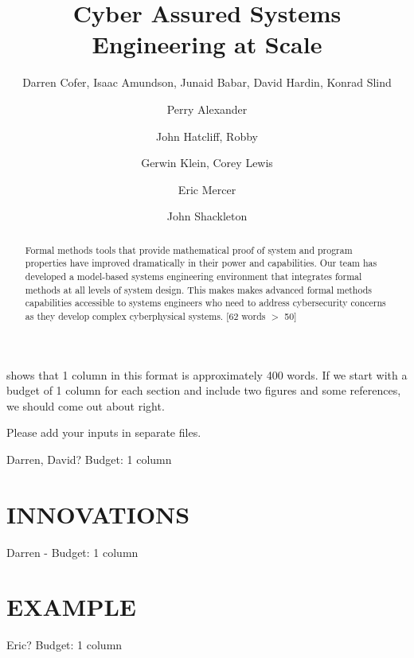 \documentclass{IEEEcsmag}
\begin{document}

\title{Cyber Assured Systems Engineering at Scale}

\author{Darren Cofer, Isaac Amundson, Junaid Babar, David Hardin, Konrad Slind}

\author{Perry Alexander}

\author{John Hatcliff, Robby}

\author{Gerwin Klein, Corey Lewis}

\author{Eric Mercer}

\author{John Shackleton}


\begin{abstract}
Formal methods tools that provide mathematical proof of system and program properties 
have improved dramatically in their power and capabilities. Our team has developed a model-based systems 
engineering environment that integrates formal methods at all levels of system design. 
This makes makes advanced formal methods capabilities accessible to systems engineers who need to address 
cybersecurity concerns as they develop complex cyberphysical systems. 
[62 words $>$ 50]
\end{abstract}

\maketitle


 shows that 1 column in this format is approximately 400 words.  If we start with a budget of 1 column for each section and include two figures and some references, we should come out about right.  

Please add your inputs in separate files.

Darren, David? Budget: 1 column


\section{INNOVATIONS}
Darren -  Budget: 1 column


\section{EXAMPLE}
Eric?  Budget: 1 column

\end{document}
